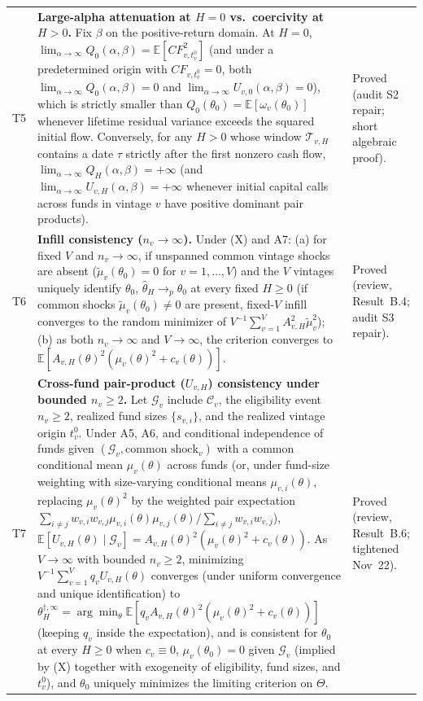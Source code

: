 \documentclass[11pt]{article}
\newcommand{\E}{\mathbb{E}}
\newcommand{\C}{\mathcal{C}}
\begin{document}
{\begin{longtable}{@{}L{0.7cm}L{9.4cm}L{5.2cm}@{}}
T5 & \textbf{Large-alpha attenuation at $H=0$ vs.\ coercivity at $H>0$.} Fix $\beta$ on the positive-return domain. At $H=0$, $\lim_{\alpha\to\infty}Q_0(\alpha,\beta)=\E[CF_{v,t_v^0}^2]$ (and under a predetermined origin with $CF_{v,t_v^0}=0$, both $\lim_{\alpha\to\infty}Q_0(\alpha,\beta)=0$ and $\lim_{\alpha\to\infty}U_{v,0}(\alpha,\beta)=0$), which is strictly smaller than $Q_0(\theta_0)=\E[\omega_v(\theta_0)]$ whenever lifetime residual variance exceeds the squared initial flow. Conversely, for any $H>0$ whose window $\mathcal{T}_{v,H}$ contains a date $\tau$ strictly after the first nonzero cash flow, $\lim_{\alpha\to\infty}Q_H(\alpha,\beta)=+\infty$ (and $\lim_{\alpha\to\infty}U_{v,H}(\alpha,\beta)=+\infty$ whenever initial capital calls across funds in vintage $v$ have positive dominant pair products). & Proved (audit S2 repair; short algebraic proof).\\
T6 & \textbf{Infill consistency ($n_v\to\infty$).} Under (X) and A7: (a) for fixed $V$ and $n_v\to\infty$, if unspanned common vintage shocks are absent ($\tilde\mu_v(\theta_0)=0$ for $v=1,\dots,V$) and the $V$ vintages uniquely identify $\theta_0$, $\hat\theta_H\to_p\theta_0$ at every fixed $H\ge 0$ (if common shocks $\tilde\mu_v(\theta_0)\neq 0$ are present, fixed-$V$ infill converges to the random minimizer of $V^{-1}\sum_{v=1}^V A_{v,H}^2\tilde\mu_v^2$); (b) as both $n_v\to\infty$ and $V\to\infty$, the criterion converges to $\E[A_{v,H}(\theta)^2(\mu_v(\theta)^2+c_v(\theta))]$. & Proved (review, Result~B.4; audit S3 repair).\\
T7 & \textbf{Cross-fund pair-product ($U_{v,H}$) consistency under bounded $n_v\ge 2$.} Let $\mathcal G_v$ include $\C_v$, the eligibility event $n_v\ge 2$, realized fund sizes $\{s_{v,i}\}$, and the realized vintage origin $t_v^0$. Under A5, A6, and conditional independence of funds given $(\mathcal G_v,\text{common shock}_v)$ with a common conditional mean $\mu_v(\theta)$ across funds (or, under fund-size weighting with size-varying conditional means $\mu_{v,i}(\theta)$, replacing $\mu_v(\theta)^2$ by the weighted pair expectation $\sum_{i\neq j}w_{v,i}w_{v,j}\mu_{v,i}(\theta)\mu_{v,j}(\theta)/\sum_{i\neq j}w_{v,i}w_{v,j}$), $\E[U_{v,H}(\theta)\mid\mathcal G_v]=A_{v,H}(\theta)^2(\mu_v(\theta)^2+c_v(\theta))$. As $V\to\infty$ with bounded $n_v\ge 2$, minimizing $V^{-1}\sum_{v=1}^V q_v U_{v,H}(\theta)$ converges (under uniform convergence and unique identification) to $\theta_H^{\dagger,\infty}=\arg\min_\theta\E[q_v A_{v,H}(\theta)^2(\mu_v(\theta)^2+c_v(\theta))]$ (keeping $q_v$ inside the expectation), and is consistent for $\theta_0$ at every $H\ge 0$ when $c_v\equiv 0$, $\mu_v(\theta_0)=0$ given $\mathcal G_v$ (implied by (X) together with exogeneity of eligibility, fund sizes, and $t_v^0$), and $\theta_0$ uniquely minimizes the limiting criterion on $\Theta$. & Proved (review, Result~B.6; tightened Nov~22).\\

\end{longtable}}
\end{document}
